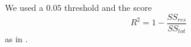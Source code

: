 We used a $0.05$ threshold and the score
\begin{equation}
R^2 = 1 - \frac{SS_{res}}{SS_{tot}}
\end{equation}
as in \citet{clark2010}.

